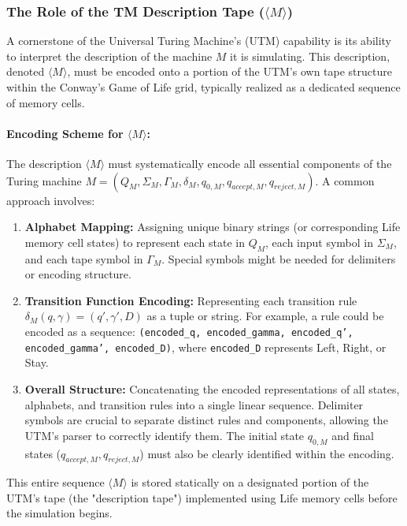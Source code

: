 \documentclass{article}
\theoremstyle{definition}
\theoremstyle{plain}
\theoremstyle{plain}
\begin{document}
\subsubsection{The Role of the TM Description Tape ($\langle M \rangle$)}
A cornerstone of the Universal Turing Machine's (UTM) capability is its ability to interpret the description of the machine $M$ it is simulating. This description, denoted $\langle M \rangle$, must be encoded onto a portion of the UTM's own tape structure within the Conway's Game of Life grid, typically realized as a dedicated sequence of memory cells.

\paragraph{Encoding Scheme for $\langle M \rangle$:}
The description $\langle M \rangle$ must systematically encode all essential components of the Turing machine $M = (Q_M, \Sigma_M, \Gamma_M, \delta_M, q_{0,M}, q_{accept,M}, q_{reject,M})$. A common approach involves:
\begin{enumerate}
  \item \textbf{Alphabet Mapping:} Assigning unique binary strings (or corresponding Life memory cell states) to represent each state in $Q_M$, each input symbol in $\Sigma_M$, and each tape symbol in $\Gamma_M$. Special symbols might be needed for delimiters or encoding structure.
  \item \textbf{Transition Function Encoding:} Representing each transition rule $\delta_M(q, \gamma) = (q', \gamma', D)$ as a tuple or string. For example, a rule could be encoded as a sequence: \texttt{(encoded\_q, encoded\_gamma, encoded\_q', encoded\_gamma', encoded\_D)}, 
  where \texttt{encoded\_D} represents Left, Right, or Stay.
  \item \textbf{Overall Structure:} Concatenating the encoded representations of all states, alphabets, and transition rules into a single linear sequence. Delimiter symbols are crucial to separate distinct rules and components, allowing the UTM's parser to correctly identify them. The initial state $q_{0,M}$ and final states ($q_{accept,M}, q_{reject,M}$) must also be clearly identified within the encoding.
\end{enumerate}
This entire sequence $\langle M \rangle$ is stored statically on a designated portion of the UTM's tape (the "description tape") implemented using Life memory cells before the simulation begins.
\end{document}
